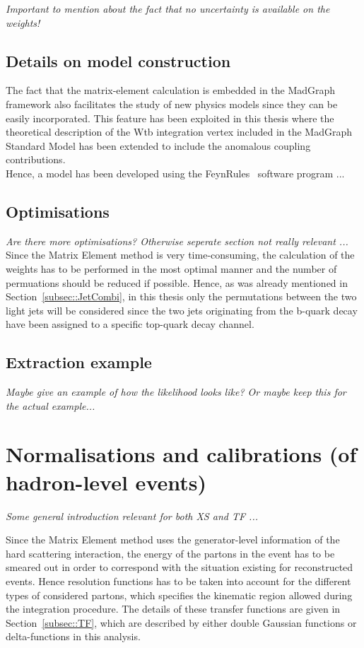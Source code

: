 \textit{Important to mention about the fact that no uncertainty is available on the weights!}

\subsection{Details on model construction}

The fact that the matrix-element calculation is embedded in the MadGraph framework also facilitates the study of new physics models since they can be easily incorporated.
This feature has been exploited in this thesis where the theoretical description of the Wtb integration vertex included in the MadGraph Standard Model has been extended to include the anomalous coupling contributions.
\\
Hence, a model has been developed using the FeynRules~\cite{} software program ...


\subsection{Optimisations}
\textit{Are there more optimisations? Otherwise seperate section not really relevant ...}
\\

Since the Matrix Element method is very time-consuming, the calculation of the weights has to be performed in the most optimal manner and the number of permuations should be reduced if possible.
Hence, as was already mentioned in Section~\ref{subsec::JetCombi}, in this thesis only the permutations between the two light jets will be considered since the two jets originating from the b-quark decay have been assigned to a specific top-quark decay channel.

\subsection{Extraction example}
\textit{Maybe give an example of how the likelihood looks like? Or maybe keep this for the actual example...}

\section{Normalisations and calibrations (of hadron-level events)} \label{sec::TF}

\textit{Some general introduction relevant for both XS and TF ...}

Since the Matrix Element method uses the generator-level information of the hard scattering interaction, the energy of the partons in the event has to be smeared out in order to correspond with the situation existing for reconstructed events. Hence resolution functions has to be taken into account for the different types of considered partons, which specifies the kinematic region allowed during the integration procedure.
The details of these transfer functions are given in Section~\ref{subsec::TF}, which are described by either double Gaussian functions or delta-functions in this analysis.

